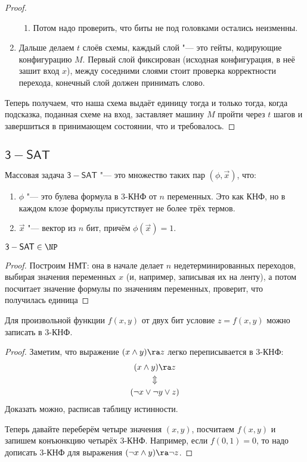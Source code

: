 \begin{proof}
\begin{enumerate}
\begin{enumerate}
					\item
						Потом надо проверить, что биты не под головками остались неизменны.
				\end{enumerate}
			\item
				Дальше делаем $t$ слоёв схемы, каждый слой "--- это гейты, кодирующие конфигурацию $M$.
				Первый слой фиксирован (исходная конфигурация, в неё зашит вход $x$), между соседними слоями стоит проверка корректности перехода,
				конечный слой должен принимать слово.
		\end{enumerate}
		Теперь получаем, что наша схема выдаёт единицу тогда и только тогда, когда подсказка, поданная схеме на вход, заставляет машину $M$ пройти через $t$ шагов и
		завершиться в принимающем состоянии, что и требовалось.
	\end{proof}

\subsection{$\mathsf{3-SAT}$}
	\begin{Def}
		Массовая задача $\mathsf{3-SAT}$ "--- это множество таких пар $(\phi, \vec x)$, что:
		\begin{enumerate}
			\item $\phi$ "--- это булева формула в 3-КНФ от $n$ переменных.
				Это как КНФ, но в каждом клозе формулы присутствует не более трёх термов.
			\item $\vec x$ "--- вектор из $n$ бит, причём $\phi(\vec x)=1$.
		\end{enumerate}
	\end{Def}

	\begin{lemma}
		$\mathsf{3-SAT} \in \NP$
	\end{lemma}
	\begin{proof}
		Построим НМТ: она в начале делает $n$ недетерминированных переходов, выбирая значения переменных $x$ (и, например, записывая их на ленту),
		а потом посчитает значение формулы по значениям переменных, проверит, что получилась единица
	\end{proof}

	\begin{lemma}
		Для произвольной функции $f(x, y)$ от двух бит условие $z=f(x, y)$ можно записать в 3-КНФ.
	\end{lemma}
	\begin{proof}
		Заметим, что выражение $(x \land y) \ra z$ легко переписывается в 3-КНФ:
		\begin{gather*}
			(x \land y) \ra z \\
			\Updownarrow \\
			(\lnot x \lor \lnot y \lor z)
		\end{gather*}
		Доказать можно, расписав таблицу истинности.

		Теперь давайте переберём четыре значения $(x, y)$, посчитаем $f(x, y)$ и запишем конъюнкцию четырёх 3-КНФ.
		Например, если $f(0, 1)=0$, то надо дописать 3-КНФ для выражения $(\lnot x \land y) \ra \lnot z$.
	\end{proof}

